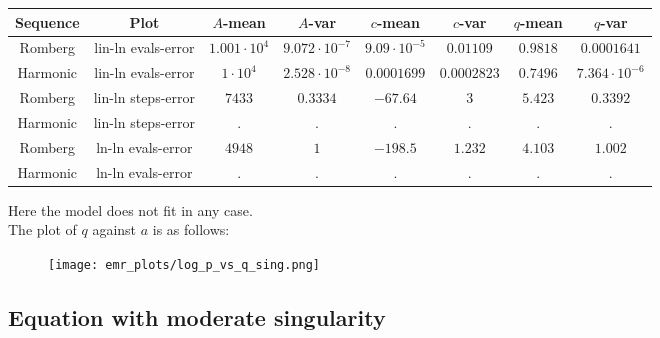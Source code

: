\begin{table}[H]
    \centering
    \small
     \begin{tabular}{c|c||c|c|c|c|c|c}
Sequence & Plot & \(A\)-mean & \(A\)-var & \(c\)-mean & \(c\)-var & \(q\)-mean & \(q\)-var\\\hline
Romberg & lin-ln evals-error & \(1.001\cdot 10^{4}\) & \(9.072\cdot 10^{-7}\) & \(9.09\cdot 10^{-5}\) & \(0.01109\) & \(0.9818\) & \(0.0001641\) \\
Harmonic & lin-ln evals-error & \(1\cdot 10^{4}\) & \(2.528\cdot 10^{-8}\) & \(0.0001699\) & \(0.0002823\) & \(0.7496\) & \(7.364\cdot 10^{-6}\) \\
Romberg & lin-ln steps-error & \(7433\) & \(0.3334\) & \(-67.64\) & \(3\) & \(5.423\) & \(0.3392\) \\
Harmonic & lin-ln steps-error & . & . & . & . & . & . \\
Romberg & ln-ln evals-error & \(4948\) & \(1\) & \(-198.5\) & \(1.232\) & \(4.103\) & \(1.002\) \\
Harmonic & ln-ln evals-error & . & . & . & . & . & . \\
    \end{tabular}
    \label{tab:my_label}
\end{table}

Here the model does not fit in any case.\\

The plot of \(q\) against \(a\) is as follows:

\begin{figure}[H]
\centering
\begin{minipage}{0.45\textwidth}
\centering
\texttt{[image: emr\_plots/log\_p\_vs\_q\_sing.png]}
\end{minipage}
\end{figure}

\subsection{Equation with moderate singularity}

